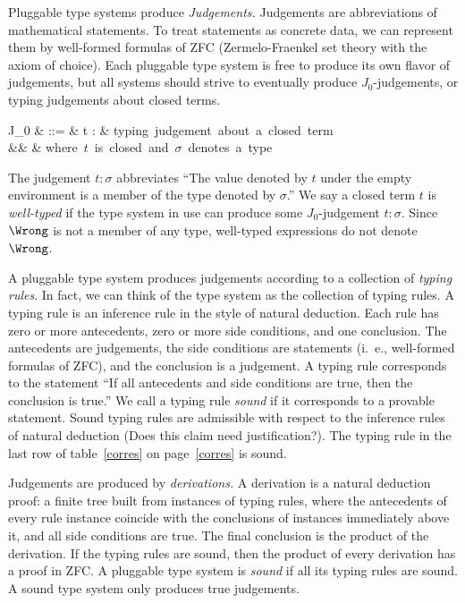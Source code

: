 \documentclass{amsart}
\begin{document}
Pluggable type systems produce \emph{Judgements.} Judgements are
abbreviations of mathematical statements. To treat statements as
concrete data, we can represent them by well-formed formulas of
ZFC (Zermelo-Fraenkel set theory with the axiom of choice). Each
pluggable type system is free to produce its own flavor of
judgements, but all systems should strive to eventually produce
$J_0$-judgements, or typing judgements about closed terms.
\begin{syntax}
J_0
& ::=
& t : \sigma
   & \mbox{typing judgement about a closed term} \\
&& & \mbox{where $t$ is closed and $\sigma$ denotes a type}
\end{syntax}%
The judgement $t:\sigma$ abbreviates ``The value denoted by $t$
under the empty environment is a member of the type denoted by
$\sigma$.'' We say a closed term $t$ is \emph{well-typed} if the
type system in use can produce some $J_0$-judgement $t:\sigma$.
Since $\Wrong$ is not a member of any type, well-typed
expressions do not denote $\Wrong$.

A pluggable type system produces judgements according to a
collection of \emph{typing rules}. In fact, we can think of the
type system as the collection of typing rules. A typing rule is
an inference rule in the style of natural deduction. Each rule
has zero or more antecedents, zero or more side conditions, and
one conclusion. The antecedents are judgements, the side
conditions are statements (i.~e., well-formed formulas of ZFC),
and the conclusion is a judgement. A typing rule corresponds to
the statement ``If all antecedents and side conditions are true,
then the conclusion is true.'' We call a typing rule \emph{sound}
if it corresponds to a provable statement. Sound typing rules are
admissible with respect to the inference rules of natural
deduction (Does this claim need justification?). The typing rule
in the last row of table~\ref{corres} on page~\ref{corres} is
sound.

Judgements are produced by \emph{derivations.} A derivation is a
natural deduction proof: a finite tree built from instances of
typing rules, where the antecedents of every rule instance
coincide with the conclusions of instances immediately above it,
and all side conditions are true. The final conclusion is the
product of the derivation. If the typing rules are sound, then
the product of every derivation has a proof in ZFC. A pluggable
type system is \emph{sound} if all its typing rules are sound. A
sound type system only produces true judgements.
\end{document}
